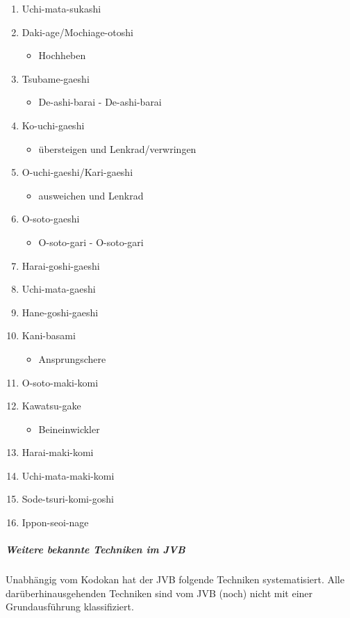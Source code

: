 \documentclass[justified, a4paper, notitlepage, captions=tableheading, nobib]{tufte-handout}
\begin{document}
\begin{itemize}
\begin{enumerate}
\item Uchi-mata-sukashi
\item Daki-age/Mochiage-otoshi
\begin{itemize}
\item Hochheben
\end{itemize}
\item Tsubame-gaeshi
\begin{itemize}
\item De-ashi-barai - De-ashi-barai
\end{itemize}
\item Ko-uchi-gaeshi
\begin{itemize}
\item übersteigen und Lenkrad/verwringen
\end{itemize}
\item O-uchi-gaeshi/Kari-gaeshi
\begin{itemize}
\item ausweichen und Lenkrad
\end{itemize}
\item O-soto-gaeshi
\begin{itemize}
\item O-soto-gari - O-soto-gari
\end{itemize}
\item Harai-goshi-gaeshi
\item Uchi-mata-gaeshi
\item Hane-goshi-gaeshi
\item Kani-basami
\begin{itemize}
\item Ansprungschere
\end{itemize}
\item O-soto-maki-komi
\item Kawatsu-gake
\begin{itemize}
\item Beineinwickler
\end{itemize}
\item Harai-maki-komi
\item Uchi-mata-maki-komi
\item Sode-tsuri-komi-goshi
\item Ippon-seoi-nage
\end{enumerate}
\end{itemize}

\subparagraph{Weitere bekannte Techniken im JVB}
\label{sec:org3d6208a}
Unabhängig vom Kodokan hat der JVB folgende Techniken systematisiert. Alle darüberhinausgehenden Techniken sind vom JVB (noch) nicht mit einer Grundausführung klassifiziert.
\end{document}
